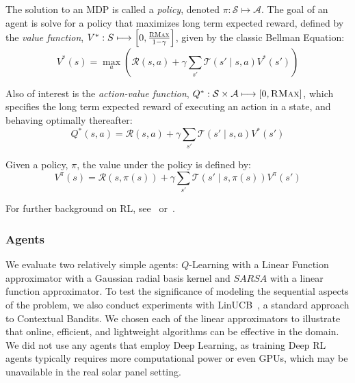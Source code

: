 \documentclass{article}
\newcommand{\mc}{\mathcal}
\begin{document}
{The solution to an MDP is called a {\it policy}, denoted $\pi : \mc{S} \longmapsto \mc{A}$. The goal of an agent is solve for a policy that maximizes long term expected reward, defined by the {\it value function}, $V^* : S \longmapsto \left[0,\frac{\textsc{RMax}}{1-\gamma}\right]$, given by the classic Bellman Equation:
\begin{equation}
V^*(s) = \max_a \left(\mc{R}(s,a) + \gamma \sum_{s'} \mc{T}(s' \mid s, a) V^*(s') \right)
\end{equation}

Also of interest is the {\it action-value function}, $Q^*: \mc{S} \times \mc{A} \longmapsto [0,\textsc{RMax}]$, which specifies the long term expected reward of executing an action in a state, and behaving optimally thereafter:
\begin{equation}
Q^*(s,a) = \mc{R}(s,a) + \gamma \sum_{s'} \mc{T}(s' \mid s,a) V^*(s')
\end{equation}

Given a policy, $\pi$, the value under the policy is defined by:
\begin{equation}
V^\pi(s) = \mc{R}(s, \pi(s)) + \gamma \sum_{s'} \mc{T}(s' \mid s, \pi(s)) V^\pi(s')
\end{equation}

For further background on RL, see~\citet{sutton1998reinforcement} or~\citet{kaelbling1996reinforcement}.

\subsubsection{Agents}
We evaluate two relatively simple agents: $Q$-Learning with a Linear Function approximator with a Gaussian radial basis kernel and $SARSA$ with a linear function approximator. To test the significance of modeling the sequential aspects of the problem, we also conduct experiments with LinUCB~\cite{li2010contextual}, a standard approach to Contextual Bandits. We chosen each of the linear approximators to illustrate that online, efficient, and lightweight algorithms can be effective in the domain. We did not use any agents that employ Deep Learning, as training Deep RL agents typically requires more computational power or even GPUs, which may be unavailable in the real solar panel setting. 

}
\end{document}
